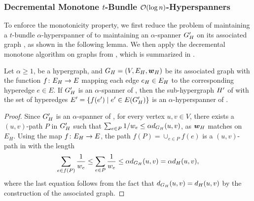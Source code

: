 \subsubsection{Decremental Monotone \( t \)-Bundle \( \atmost{\log n} \)-Hyperspanners} \label{subsec:t-bundle}

To enforce the monotonicity property, we first reduce the problem of maintaining a \( t \)-bundle \( \alpha \)-hyperspanner of  to maintaining an \( \alpha \)-spanner \( G_{ H}' \) on its associated graph , as shown in the following lemma.
We then apply the decremental monotone algorithm on graphs from \cite{Abraham:2016aa}, which is summarized in .


\begin{lemma} \label{lem:Oko_associated_graph}
Let \( \alpha \geq 1 \),  be a hypergraph, and \( {G_{ H}} = (V, E_{ H}, \boldsymbol{w}_{ H} ) \) be its associated graph with the function \( f \colon E_{ H} \to E \) mapping each edge \( e_{ H} \in E_{ H}  \) to the corresponding hyperedge \( e \in E \).
If \( G_{ H}' \) is an \( \alpha \)-spanner of , then the sub-hypergraph \( { H}' \) of  with the set of hyperedges \( E' = \{ f(e') \mid e' \in E(G_{ H}')  \} \) is an \( \alpha \)-hyperspanner of .
\end{lemma}

\begin{proof}
Since \( G_{ H}' \) is an \( \alpha \)-spanner of , for every vertex \( u, v \in V \), there exists a \( (u, v) \)-path \( P \) in \( G_{ H}' \) such that \( \sum_{e \in P} 1/w_e \leq \alpha d_{G_{ H}}(u, v) \), as \( \boldsymbol{w}_H \) matches  on \( E_H \).
Using the map \( f \colon E_{ H} \to E \), the path \( f(P) = \cup _{e \in P} f(e) \) is a \( (u, v) \)-path in  with the length
\begin{equation*}
\sum_{e \in f(P)} \frac{1}{w_e}
\leq
\sum_{e \in P} \frac{1}{w_e}
\leq
\alpha d_{G_{ H}}(u, v)
= \alpha d_{ H}(u, v),
\end{equation*}
where the last equation follows from the fact that \( d_{G_{ H}}(u, v)
= d_{ H}(u, v) \) by the construction of the associated graph.
\end{proof}




